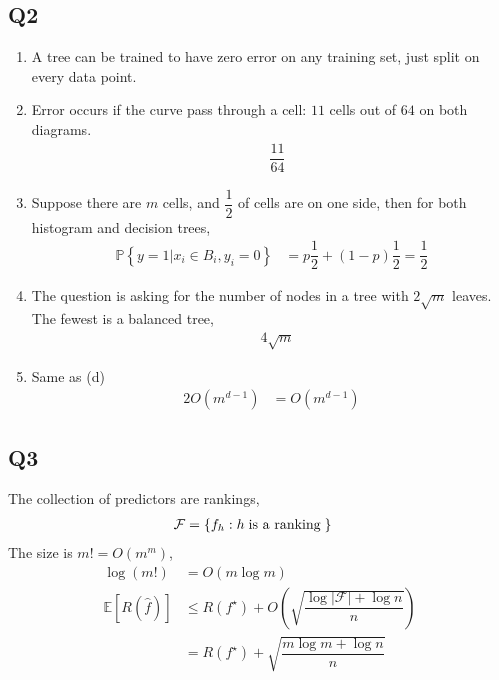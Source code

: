 \documentclass{article}
\begin{document}
\subsection{Q2}
\begin{enumerate}
\item A tree can be trained to have zero error on any training set, just split on every data point.
\end{enumerate}

\begin{enumerate}
\setcounter{enumii}{1}
\item Error occurs if the curve pass through a cell: $11$ cells out of $64$ on both diagrams.
\begin{align*}
&\dfrac{11}{64}
\end{align*}
\item Suppose there are $m $ cells, and $\dfrac{1}{2}$ of cells are on one side, then for both histogram and decision trees,
\begin{align*}
\mathbb{P}\left\{y = 1 | x_{i} \in B_{i}, y_{i} = 0\right\} &= p  \dfrac{1}{2} + \left(1 - p \right) \dfrac{1}{2} = \dfrac{1}{2}
\end{align*}
\item The question is asking for the number of nodes in a tree with $2 \sqrt{m}$ leaves.
The fewest is a balanced tree,
\begin{align*}
&4 \sqrt{m}
\end{align*}
\item Same as (d)
\begin{align*}
2 O\left(m^{d-1}\right) &= O\left(m^{d-1}\right)
\end{align*}
\end{enumerate}


\subsection{Q3}
The collection of predictors are rankings,
\begin{align*}
\mathcal{F} &= \left\{f_{h} : h \text{\;is a ranking\;}\right\}
\end{align*}
The size is $m!  = O\left(m^{m}\right)$,
\begin{align*}
\log\left(m!\right) &= O\left(m \log m \right)
\\ \mathbb{E}\left[R\left(\hat{f}\right)\right] &\leq  R\left(f^\star \right) + O\left(\sqrt{\dfrac{\log | \mathcal{F} | + \log n}{n}}\right)
\\ &= R\left(f^\star \right) + \sqrt{\dfrac{m \log m + \log n}{n}}
\end{align*}
\end{document}
